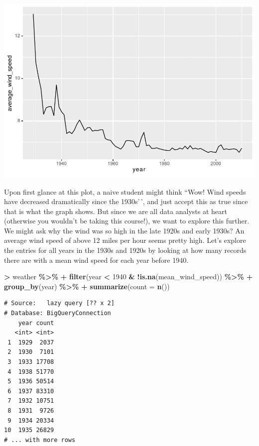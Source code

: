 \documentclass[
]{krantz}
\makeatletter
\newenvironment{Shaded}{\begin{snugshade}}{\end{snugshade}}
\newcommand{\DataTypeTok}[1]{\textcolor[rgb]{0.27,0.27,0.27}{#1}}
\newcommand{\DecValTok}[1]{\textcolor[rgb]{0.06,0.06,0.06}{#1}}
\newcommand{\KeywordTok}[1]{\textcolor[rgb]{0.27,0.27,0.27}{\textbf{#1}}}
\newcommand{\NormalTok}[1]{#1}
\newcommand{\OperatorTok}[1]{\textcolor[rgb]{0.43,0.43,0.43}{\textbf{#1}}}
\newcommand{\StringTok}[1]{\textcolor[rgb]{0.5,0.5,0.5}{#1}}
\newenvironment{kframe}{%
\medskip{}
\setlength{\fboxsep}{.8em}
 \def\at@end@of@kframe{}%
 \ifinner\ifhmode%
  \def\at@end@of@kframe{\end{minipage}}%
  \begin{minipage}{\columnwidth}%
 \fi\fi%
 \def\FrameCommand##1{\hskip\@totalleftmargin \hskip-\fboxsep
 \colorbox{shadecolor}{##1}\hskip-\fboxsep
     \hskip-\linewidth \hskip-\@totalleftmargin \hskip\columnwidth}%
 \MakeFramed {\advance\hsize-\width
   \@totalleftmargin\z@ \linewidth\hsize
   \@setminipage}}%
 {\par\unskip\endMakeFramed%
 \at@end@of@kframe}
\renewenvironment{Shaded}{\begin{kframe}}{\end{kframe}}
\makeatother
\begin{document}
\includegraphics{bookdown_files/figure-latex/unnamed-chunk-322-1.pdf}

Upon first glance at this plot, a naive student might think ``Wow! Wind speeds have decreased dramatically since the 1930s'\,', and just accept this as true since that is what the graph shows. But since we are all data analysts at heart (otherwise you wouldn't be taking this course!), we want to explore this further. We might ask why the wind was so high in the late 1920s and early 1930s? An average wind speed of above 12 miles per hour seems pretty high. Let's explore the entries for all years in the 1930s and 1920s by looking at how many records there are with a mean wind speed for each year before 1940.

\begin{Shaded}
\begin{Highlighting}[]
\OperatorTok{\textgreater{}}\StringTok{ }\NormalTok{weather }\OperatorTok{\%\textgreater{}\%}
\OperatorTok{+}\StringTok{   }\KeywordTok{filter}\NormalTok{(year }\OperatorTok{\textless{}}\StringTok{ }\DecValTok{1940} \OperatorTok{\&}\StringTok{ }\OperatorTok{!}\KeywordTok{is.na}\NormalTok{(mean\_wind\_speed)) }\OperatorTok{\%\textgreater{}\%}
\OperatorTok{+}\StringTok{   }\KeywordTok{group\_by}\NormalTok{(year) }\OperatorTok{\%\textgreater{}\%}
\OperatorTok{+}\StringTok{   }\KeywordTok{summarize}\NormalTok{(}\DataTypeTok{count =} \KeywordTok{n}\NormalTok{())}
\end{Highlighting}
\end{Shaded}

\begin{verbatim}
# Source:   lazy query [?? x 2]
# Database: BigQueryConnection
    year count
   <int> <int>
 1  1929  2037
 2  1930  7101
 3  1933 17708
 4  1938 51770
 5  1936 50514
 6  1937 83310
 7  1932 10751
 8  1931  9726
 9  1934 20334
10  1935 26829
# ... with more rows
\end{verbatim}
\end{document}
